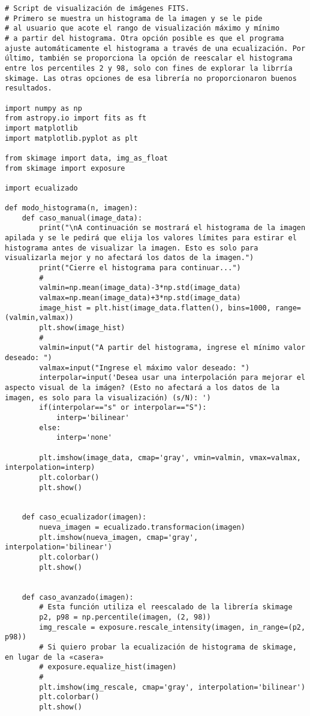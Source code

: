 \begin{lstlisting}[style=python]
# Script de visualización de imágenes FITS.
# Primero se muestra un histograma de la imagen y se le pide
# al usuario que acote el rango de visualización máximo y mínimo
# a partir del histograma. Otra opción posible es que el programa ajuste automáticamente el histograma a través de una ecualización. Por último, también se proporciona la opción de reescalar el histograma entre los percentiles 2 y 98, solo con fines de explorar la librría skimage. Las otras opciones de esa librería no proporcionaron buenos resultados.

import numpy as np
from astropy.io import fits as ft
import matplotlib
import matplotlib.pyplot as plt

from skimage import data, img_as_float
from skimage import exposure

import ecualizado

def modo_histograma(n, imagen):
    def caso_manual(image_data):
        print("\nA continuación se mostrará el histograma de la imagen apilada y se le pedirá que elija los valores límites para estirar el histograma antes de visualizar la imagen. Esto es solo para visualizarla mejor y no afectará los datos de la imagen.")
        print("Cierre el histograma para continuar...")
        #
        valmin=np.mean(image_data)-3*np.std(image_data)
        valmax=np.mean(image_data)+3*np.std(image_data)
        image_hist = plt.hist(image_data.flatten(), bins=1000, range=(valmin,valmax))
        plt.show(image_hist)
        #
        valmin=input("A partir del histograma, ingrese el mínimo valor deseado: ")
        valmax=input("Ingrese el máximo valor deseado: ")
        interpolar=input('Desea usar una interpolación para mejorar el aspecto visual de la imágen? (Esto no afectará a los datos de la imagen, es solo para la visualización) (s/N): ')
        if(interpolar=="s" or interpolar=="S"):
            interp='bilinear'
        else:
            interp='none'
            
        plt.imshow(image_data, cmap='gray', vmin=valmin, vmax=valmax, interpolation=interp)
        plt.colorbar()
        plt.show()
            
            
    def caso_ecualizador(imagen):
        nueva_imagen = ecualizado.transformacion(imagen)
        plt.imshow(nueva_imagen, cmap='gray', interpolation='bilinear')
        plt.colorbar()
        plt.show()


    def caso_avanzado(imagen):
        # Esta función utiliza el reescalado de la librería skimage
        p2, p98 = np.percentile(imagen, (2, 98))
        img_rescale = exposure.rescale_intensity(imagen, in_range=(p2, p98))
        # Si quiero probar la ecualización de histograma de skimage, en lugar de la «casera»
        # exposure.equalize_hist(imagen)
        #
        plt.imshow(img_rescale, cmap='gray', interpolation='bilinear')
        plt.colorbar()
        plt.show()
        


\end{lstlisting}
